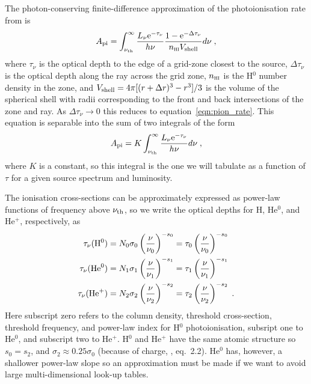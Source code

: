 \documentclass[a4paper,11pt]{article}
\begin{document}
The photon-conserving finite-difference approximation of the photoionisation rate from \citet{MelIliAlvEA06} is
\begin{equation}
A_{\mathrm{pi}} = \int_{\nu_{\mathrm{th}}}^{\infty}
    \frac{L_\nu \mathrm{e}^{-\tau_\nu}}{h\nu} 
    \frac{1-\mathrm{e}^{-\Delta\tau_\nu}}{n_{\textsc{hi}}V_{\mathrm{shell}}}  d\nu \;,
\label{eqn:pion_FVrate}
\end{equation}
where $\tau_\nu$ is the optical depth to the edge of a grid-zone closest to the source, $\Delta\tau_\nu$ is the optical depth along the ray across the grid zone,
$n_{\textsc{hi}}$ is the  H$^0$ number density in the zone, and
$V_{\mathrm{shell}} = 4\pi[(r+\Delta r)^3-r^3]/3$ is the volume of the spherical shell with radii corresponding to the front and back intersections of the zone and ray.
As $\Delta\tau_\nu\rightarrow0$ this reduces to equation~\ref{eqn:pion_rate}.
This equation is separable into the sum of two integrals of the form
\begin{equation}
A_{\mathrm{pi}} = K\int_{\nu_{\mathrm{th}}}^{\infty}
    \frac{L_\nu \mathrm{e}^{-\tau_\nu}}{h\nu}  d\nu \;,
\label{eqn:pion_tab}
\end{equation}
where $K$ is a constant, so this integral is the one we will tabulate as a function of $\tau$ for a given source spectrum and luminosity.

The ionisation cross-sections can be approximately expressed as power-law functions of frequency above $\nu_{\mathrm{th}}$, so we write the optical depths for H, He$^0$, and He$^+$, respectively, as
\begin{align}
\tau_\nu(\mathrm{H}^0)  &= N_0\sigma_0\left(\frac{\nu}{\nu_0}\right)^{-s_0} = \tau_0\left(\frac{\nu}{\nu_0}\right)^{-s_0}\nonumber\\
\tau_\nu(\mathrm{He}^0) &= N_1\sigma_1\left(\frac{\nu}{\nu_1}\right)^{-s_1} = \tau_1\left(\frac{\nu}{\nu_1}\right)^{-s_1}\nonumber\\
\tau_\nu(\mathrm{He}^+) &= N_2\sigma_2\left(\frac{\nu}{\nu_2}\right)^{-s_2} = \tau_2\left(\frac{\nu}{\nu_2}\right)^{-s_2}\;.
\end{align}
Here subscript zero refers to the column density, threshold cross-section, threshold frequency, and power-law index for H$^0$ photoionisation, subsript one to He$^0$, and subscript two to He$^+$.
H$^0$ and He$^+$ have the same atomic structure so $s_0=s_2$, and $\sigma_2\approx0.25\sigma_0$ (because of charge, \citealt{Ost89}, eq.~2.2).
He$^0$ has, however, a shallower power-law slope so an approximation must be made if we want to avoid large multi-dimensional look-up tables.
\end{document}
